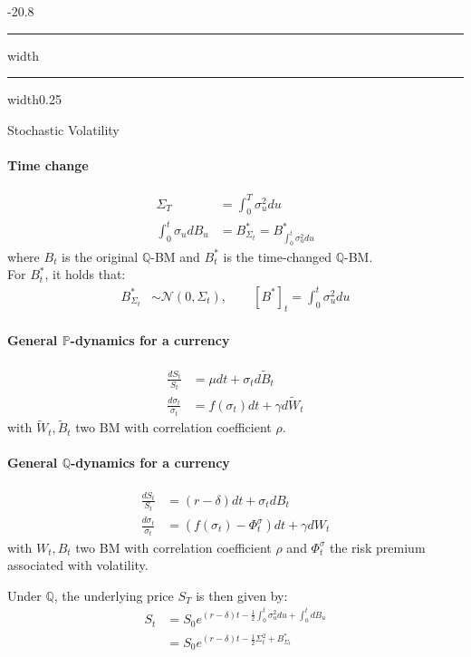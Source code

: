 \documentclass[a4paper,landscape,8pt,fleqn]{scrartcl}
\makeatletter
\renewcommand{\section}{\@startsection{section}{1}{0mm}%
{-2\baselineskip}{0.8\baselineskip}%
{\hrule depth 0.2pt width\columnwidth\hrule depth1.5pt
width0.25\columnwidth\vspace*{1.2em}\Large\bfseries}}
\makeatother
\begin{document}
\begin{multicols*}{4}
\section{Stochastic Volatility}

\paragraph{Time change}
\begin{align*}
\Sigma_T &= \int_0^T \sigma_u^2 du \\
\int_0^t \sigma_u dB_u &= B^\ast_{\Sigma_t} = B^\ast_{\int_0^t \sigma_u^2 du}
\end{align*}
where $B_t$ is the original $\mathbb{Q}$-BM and $B_t^\ast$ is the time-changed $\mathbb{Q}$-BM. \\
For $B_t^\ast$, it holds that:
\begin{align*}
B_{\Sigma_t}^\ast &\sim \mathcal{N}(0,\Sigma_t), \qquad \left[ B^\ast \right]_t = \int_0^t \sigma_u^2 du
\end{align*}

\paragraph{General $\mathbb{P}$-dynamics for a currency}
\begin{align*}
\frac{dS_t}{S_t} &= \mu dt + \sigma_t d \tilde B_t \\
\frac{d\sigma_t}{\sigma_t} &= f(\sigma_t) dt + \gamma d \tilde W_t
\end{align*}
with $\tilde W_t, \tilde B_t$ two BM with correlation coefficient $\rho$.

\paragraph{General $\mathbb{Q}$-dynamics for a currency}
\begin{align*}
\frac{dS_t}{S_t} &= (r - \delta) dt + \sigma_t dB_t \\
\frac{d\sigma_t}{\sigma_t} &= \left( f(\sigma_t) - \Phi_t^\sigma \right) dt + \gamma d W_t
\end{align*}
with $W_t, B_t$ two BM with correlation coefficient $\rho$ and $\Phi_t^\sigma$ the risk premium associated with volatility.

Under $\mathbb{Q}$, the underlying price $S_T$ is then given by:
\begin{align*}
S_t &= S_0 e^{(r-\delta)t - \frac{1}{2} \int_0^t \sigma_u^2 du + \int_0^t dB_u} \\
&= S_0 e^{(r-\delta)t - \frac{1}{2} \Sigma_t^2 + B^\ast_{\Sigma_t}}
\end{align*}


\end{multicols*}
\end{document}
